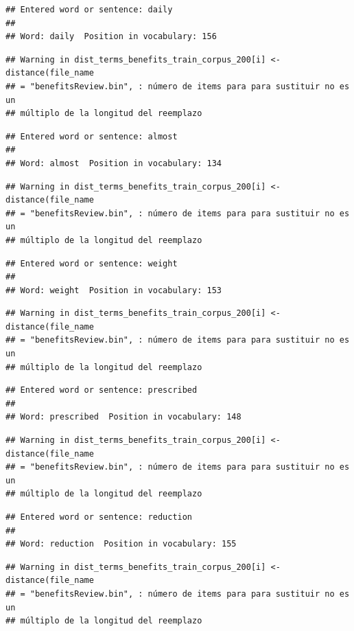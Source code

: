 \documentclass[spanish,]{article}
\begin{document}
\begin{verbatim}
## Entered word or sentence: daily
## 
## Word: daily  Position in vocabulary: 156
\end{verbatim}

\begin{verbatim}
## Warning in dist_terms_benefits_train_corpus_200[i] <- distance(file_name
## = "benefitsReview.bin", : número de items para para sustituir no es un
## múltiplo de la longitud del reemplazo
\end{verbatim}

\begin{verbatim}
## Entered word or sentence: almost
## 
## Word: almost  Position in vocabulary: 134
\end{verbatim}

\begin{verbatim}
## Warning in dist_terms_benefits_train_corpus_200[i] <- distance(file_name
## = "benefitsReview.bin", : número de items para para sustituir no es un
## múltiplo de la longitud del reemplazo
\end{verbatim}

\begin{verbatim}
## Entered word or sentence: weight
## 
## Word: weight  Position in vocabulary: 153
\end{verbatim}

\begin{verbatim}
## Warning in dist_terms_benefits_train_corpus_200[i] <- distance(file_name
## = "benefitsReview.bin", : número de items para para sustituir no es un
## múltiplo de la longitud del reemplazo
\end{verbatim}

\begin{verbatim}
## Entered word or sentence: prescribed
## 
## Word: prescribed  Position in vocabulary: 148
\end{verbatim}

\begin{verbatim}
## Warning in dist_terms_benefits_train_corpus_200[i] <- distance(file_name
## = "benefitsReview.bin", : número de items para para sustituir no es un
## múltiplo de la longitud del reemplazo
\end{verbatim}

\begin{verbatim}
## Entered word or sentence: reduction
## 
## Word: reduction  Position in vocabulary: 155
\end{verbatim}

\begin{verbatim}
## Warning in dist_terms_benefits_train_corpus_200[i] <- distance(file_name
## = "benefitsReview.bin", : número de items para para sustituir no es un
## múltiplo de la longitud del reemplazo
\end{verbatim}
\end{document}
